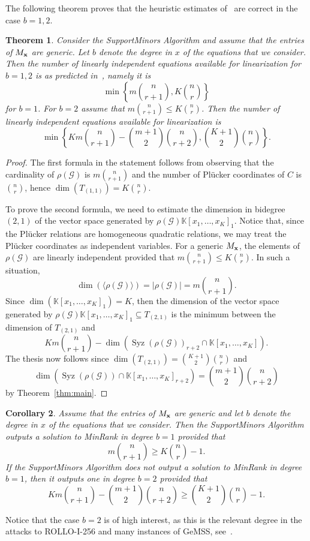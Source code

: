 \documentclass[utf8,latin1]{article}
\newtheorem{theorem}{Theorem}
\newtheorem{corollary}[theorem]{Corollary}
\DeclareMathOperator{\Syz}{Syz}
\newcommand{\KK}{\mathbb{K}}
\begin{document}
The following theorem proves that the heuristic estimates of~\cite[Sections 5.2 and 5.3]{BBCGPSTV20} are correct in the case $b=1,2$.

\begin{theorem}\label{thm:cpxty}
Consider the SupportMinors Algorithm and assume that the entries of $M_{\bf x}$ are generic. Let $b$ denote the degree in $x$ of the equations that we consider. 
Then the number of linearly independent equations available for linearization for $b=1,2$ is as predicted in~\cite[Sections 5.2 and 5.3]{BBCGPSTV20}, namely it is 
$$\min\left\{ m{n\choose r+1}, K{n\choose r}\right\}$$ for $b=1$. For $b=2$ assume that $m{n\choose r+1}\leq K{n\choose r}$. Then
the number of linearly independent equations available for linearization is $$\min\left\{ Km{n\choose r+1}-{m+1\choose 2}{n\choose r+2}, {K+1\choose 2}{n\choose r}\right\}.$$ 
\end{theorem}

\begin{proof}
The first formula in the statement follows from observing that the cardinality of $\rho(\mathcal{G})$ is $m{n\choose r+1}$ and the number of Pl\"ucker coordinates of $C$ is ${n\choose r}$, hence $\dim(T_{(1,1)})=K{n\choose r}$. 

To prove the second formula, we need to estimate the dimension in bidegree $(2,1)$ of the vector space generated by $\rho(\mathcal{G})\KK[x_1,\ldots,x_K]_1$. Notice that, since the Pl\"ucker relations are homogeneous quadratic relations, we may treat the Pl\"ucker coordinates as independent variables. For a generic $M_{\bf x}$, the elements of $\rho(\mathcal{G})$ are linearly independent provided that $m{n\choose r+1}\leq K{n\choose r}$. In such a situation, $$\dim(\langle\rho(\mathcal{G})\rangle)=|\rho(\mathcal{G})|=m{n\choose r+1}.$$ 
Since $\dim(\KK[x_1,\ldots,x_K]_1)=K$, then the dimension of the vector space generated by $\rho(\mathcal{G})\KK[x_1,\ldots,x_K]_{1}\subseteq T_{(2,1)}$ is the minimum between the dimension of $T_{(2,1)}$ and $$Km{n\choose r+1}-\dim(\Syz(\rho(\mathcal{G}))_{r+2}\cap\mathbb{K}[x_1,\ldots,x_K]).$$
The thesis now follows since $\dim(T_{(2,1)})={K+1\choose 2}{n\choose r}$
and 
$$\dim(\Syz(\rho(\mathcal{G}))\cap\mathbb{K}[x_1,\ldots,x_K]_{r+2})={m+1\choose 2}{n\choose r+2}$$ by Theorem~\ref{thm:main}.
\end{proof}

\begin{corollary}
Assume that the entries of $M_{\bf x}$ are generic and let $b$ denote the degree in $x$ of the equations that we consider. Then the SupportMinors Algorithm outputs a solution to MinRank in degree $b=1$ provided that $$m{n\choose r+1}\geq K{n\choose r}-1.$$
If the SupportMinors Algorithm does not output a solution to MinRank in degree $b=1$, then it outputs one in degree $b=2$ provided that 
$$Km{n\choose r+1}-{m+1\choose 2}{n\choose r+2}\geq {K+1\choose 2}{n\choose r}-1.$$
\end{corollary}

Notice that the case $b=2$ is of high interest, as this is the relevant degree in the attacks to ROLLO-I-256 and many instances of GeMSS, see~\cite[Sections 6.1 and 6.2]{BBCGPSTV20}.




	
\end{document}
